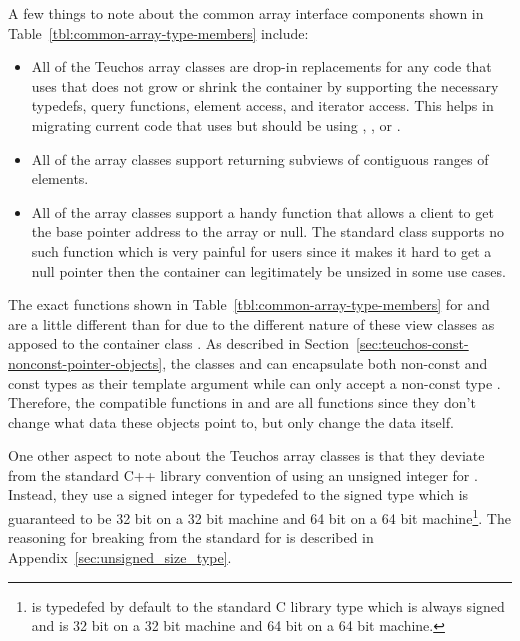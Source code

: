 \documentclass[pdf,ps2pdf,11pt]{SANDreport}
\begin{document}
A few things to note about the common array interface components shown in
Table~\ref{tbl:common-array-type-members} include:

\begin{itemize}

{}\item All of the Teuchos array classes are drop-in replacements for
any code that uses {} that does not grow or shrink
the container by supporting the necessary typedefs, query functions,
element access, and iterator access.  This helps in migrating current
code that uses {} but should be using {},
{}, {} or {}.

{}\item All of the array classes support returning 
subviews of contiguous ranges of elements.

{}\item All of the array classes support a handy {}
function that allows a client to get the base pointer address to the
array or null.  The standard {} class supports no
such function which is very painful for users since it makes it hard
to get a null pointer then the container can legitimately be unsized
in some use cases.

\end{itemize}

The exact functions shown in Table~\ref{tbl:common-array-type-members}
for {} and {} are a little different than
for {} due to the different nature of these view classes as
apposed to the container class {}.  As described in
Section~\ref{sec:teuchos-const-nonconst-pointer-objects}, the classes
{} and {} can encapsulate both non-const
and const types {} as their template argument while
{} can only accept a non-const type {}.  Therefore,
the {} compatible functions in {} and
{} are all {} functions since they don't
change what data these objects point to, but only change the data
itself.

One other aspect to note about the Teuchos array classes is that they deviate
from the standard C++ library convention of using an unsigned integer for
{}.  Instead, they use a signed integer for {}
typedefed to the signed type {} which is guaranteed to
be 32 bit on a 32 bit machine and 64 bit on a 64 bit
machine\footnote{{} is typedefed by default to the
standard C library type {} which is always signed and is 32
bit on a 32 bit machine and 64 bit on a 64 bit machine.}.  The reasoning for
breaking from the {} standard for {} is
described in Appendix~\ref{sec:unsigned_size_type}.
\end{document}
